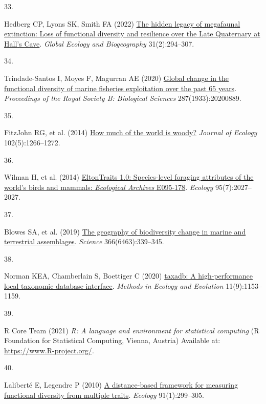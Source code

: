 \documentclass{article}
\newlength{\cslhangindent}
\newlength{\csllabelwidth}
\newlength{\cslentryspacingunit} %
\newenvironment{CSLReferences}[2] %
 {%
  \setlength{\parindent}{0pt}
  \ifodd #1
  \let\oldpar\par
  \def\par{\hangindent=\cslhangindent\oldpar}
  \fi
  \setlength{\parskip}{#2\cslentryspacingunit}
 }%
 {}
\newcommand{\CSLLeftMargin}[1]{\parbox[t]{\csllabelwidth}{#1}}
\newcommand{\CSLRightInline}[1]{\parbox[t]{\linewidth - \csllabelwidth}{#1}\break}
\begin{document}
\begin{CSLReferences}{0}{0}
\leavevmode{}%
\CSLLeftMargin{33. }%
\CSLRightInline{Hedberg CP, Lyons SK, Smith FA (2022)
\href{https://doi.org/10.1111/geb.13428}{The hidden legacy of megafaunal
extinction: Loss of functional diversity and resilience over the Late
Quaternary at Hall{'}s Cave}. \emph{Global Ecology and Biogeography}
31(2):294--307.}

\leavevmode{}%
\CSLLeftMargin{34. }%
\CSLRightInline{Trindade-Santos I, Moyes F, Magurran AE (2020)
\href{https://doi.org/10.1098/rspb.2020.0889}{Global change in the
functional diversity of marine fisheries exploitation over the past 65
years}. \emph{Proceedings of the Royal Society B: Biological Sciences}
287(1933):20200889.}

\leavevmode{}%
\CSLLeftMargin{35. }%
\CSLRightInline{FitzJohn RG, et al. (2014)
\href{https://doi.org/10.1111/1365-2745.12260}{How much of the world is
woody?} \emph{Journal of Ecology} 102(5):1266--1272.}

\leavevmode{}%
\CSLLeftMargin{36. }%
\CSLRightInline{Wilman H, et al. (2014)
\href{https://doi.org/10.1890/13-1917.1}{EltonTraits 1.0: Species-level
foraging attributes of the world's birds and mammals: {\emph{Ecological
Archives}} E095-178}. \emph{Ecology} 95(7):2027--2027.}

\leavevmode{}%
\CSLLeftMargin{37. }%
\CSLRightInline{Blowes SA, et al. (2019)
\href{https://doi.org/10.1126/science.aaw1620}{The geography of
biodiversity change in marine and terrestrial assemblages}.
\emph{Science} 366(6463):339--345.}

\leavevmode{}%
\CSLLeftMargin{38. }%
\CSLRightInline{Norman KEA, Chamberlain S, Boettiger C (2020)
\href{https://doi.org/10.1111/2041-210X.13440}{taxadb: A
high-performance local taxonomic database interface}. \emph{Methods in
Ecology and Evolution} 11(9):1153--1159.}

\leavevmode{}%
\CSLLeftMargin{39. }%
\CSLRightInline{R Core Team (2021) \emph{R: A language and environment
for statistical computing} (R Foundation for Statistical Computing,
Vienna, Austria) Available at: \url{https://www.R-project.org/}.}

\leavevmode{}%
\CSLLeftMargin{40. }%
\CSLRightInline{Laliberté E, Legendre P (2010)
\href{https://doi.org/10.1890/08-2244.1}{A distance-based framework for
measuring functional diversity from multiple traits}. \emph{Ecology}
91(1):299--305.}


\end{CSLReferences}
\end{document}
